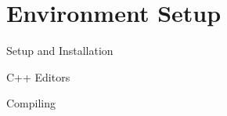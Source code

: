 \documentclass[../lecture1-introduction.tex]{subfiles}
\begin{document}
\section{Environment Setup}


\begin{frame}[fragile]{Setup and Installation}



\end{frame}


\begin{frame}[fragile]{C++ Editors}



\end{frame}


\begin{frame}[fragile]{Compiling}



\end{frame}

\end{document}
